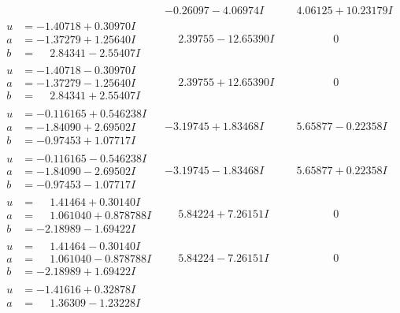 \documentclass[1p]{elsarticle_modified}
\theoremstyle{definition}
\begin{document}
$$\begin{array}{c|c|c}
 & -0.26097 - 4.06974 I & \phantom{-}4.06125 + 10.23179 I \\ \hline\begin{aligned}
u &= -1.40718 + 0.30970 I \\
a &= -1.37279 + 1.25640 I \\
b &= \phantom{-}2.84341 - 2.55407 I\end{aligned}
 & \phantom{-}2.39755 - 12.65390 I & \phantom{-0.000000 } 0 \\ \hline\begin{aligned}
u &= -1.40718 - 0.30970 I \\
a &= -1.37279 - 1.25640 I \\
b &= \phantom{-}2.84341 + 2.55407 I\end{aligned}
 & \phantom{-}2.39755 + 12.65390 I & \phantom{-0.000000 } 0 \\ \hline\begin{aligned}
u &= -0.116165 + 0.546238 I \\
a &= -1.84090 + 2.69502 I \\
b &= -0.97453 + 1.07717 I\end{aligned}
 & -3.19745 + 1.83468 I & \phantom{-}5.65877 - 0.22358 I \\ \hline\begin{aligned}
u &= -0.116165 - 0.546238 I \\
a &= -1.84090 - 2.69502 I \\
b &= -0.97453 - 1.07717 I\end{aligned}
 & -3.19745 - 1.83468 I & \phantom{-}5.65877 + 0.22358 I \\ \hline\begin{aligned}
u &= \phantom{-}1.41464 + 0.30140 I \\
a &= \phantom{-}1.061040 + 0.878788 I \\
b &= -2.18989 - 1.69422 I\end{aligned}
 & \phantom{-}5.84224 + 7.26151 I & \phantom{-0.000000 } 0 \\ \hline\begin{aligned}
u &= \phantom{-}1.41464 - 0.30140 I \\
a &= \phantom{-}1.061040 - 0.878788 I \\
b &= -2.18989 + 1.69422 I\end{aligned}
 & \phantom{-}5.84224 - 7.26151 I & \phantom{-0.000000 } 0 \\ \hline\begin{aligned}
u &= -1.41616 + 0.32878 I \\
a &= \phantom{-}1.36309 - 1.23228 I \\

\end{aligned}
\end{array}$$
\end{document}

